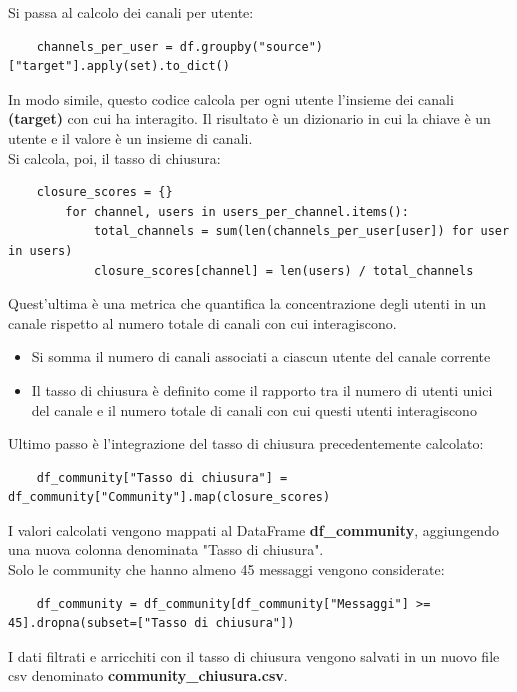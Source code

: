 \documentclass[12pt]{article}
\begin{document}
	Si passa al calcolo dei canali per utente:
	\begin{lstlisting}
	channels_per_user = df.groupby("source")["target"].apply(set).to_dict()
	\end{lstlisting}
	In modo simile, questo codice calcola per ogni utente l'insieme dei canali \textbf{(target)} con cui ha interagito. Il risultato è un dizionario in cui la chiave è un utente e il valore è un insieme di canali.\\
	Si calcola, poi, il tasso di chiusura:
	\begin{lstlisting}
	closure_scores = {}
		for channel, users in users_per_channel.items():
			total_channels = sum(len(channels_per_user[user]) for user in users)
			closure_scores[channel] = len(users) / total_channels
	\end{lstlisting}
	Quest'ultima è una metrica che quantifica la concentrazione degli utenti in un canale rispetto al numero totale di canali con cui interagiscono.
	\begin{itemize}[label=]
		\item Si somma il numero di canali associati a ciascun utente del canale corrente
		\item Il tasso di chiusura è definito come il rapporto tra il numero di utenti unici del canale e il numero totale di canali con cui questi utenti interagiscono
	\end{itemize}
	Ultimo passo è l'integrazione del tasso di chiusura precedentemente calcolato:
	\begin{lstlisting}
	df_community["Tasso di chiusura"] = df_community["Community"].map(closure_scores)
	\end{lstlisting}
	I valori calcolati vengono mappati al DataFrame \textbf{df\_community}, aggiungendo una nuova colonna denominata "Tasso di chiusura".\\
	Solo le community che hanno almeno 45 messaggi vengono considerate:
	\begin{lstlisting}
	df_community = df_community[df_community["Messaggi"] >= 45].dropna(subset=["Tasso di chiusura"])
	\end{lstlisting}
	I dati filtrati e arricchiti con il tasso di chiusura vengono salvati in un nuovo file csv denominato \textbf{community\_chiusura.csv}.
	\newpage
\end{document}
